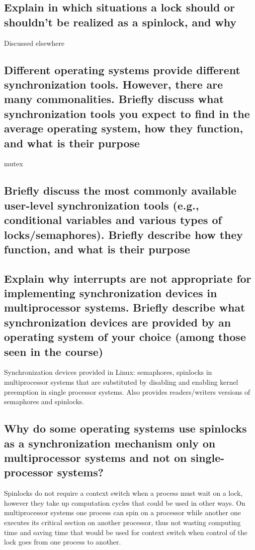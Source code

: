 \documentclass{article}
\begin{document}
\subsection{Explain in which situations a lock should or shouldn't be realized as a spinlock, and why}
Discussed elsewhere

\subsection{Different operating systems provide different synchronization tools. However, there are many commonalities. Briefly discuss what synchronization tools you expect to find in the average operating system, how they function, and what is their purpose}
mutex

\subsection{Briefly discuss the most commonly available user-level synchronization tools (e.g., conditional variables and various types of locks/semaphores). Briefly describe how they function, and what is their purpose}

\subsection{Explain why interrupts are not appropriate for implementing synchronization devices in multiprocessor systems. Briefly describe what synchronization devices are provided by an  operating system of your choice (among those seen in the course)}
Synchronization devices provided in Linux: semaphores, spinlocks in multiprocessor systems that are substituted by disabling and enabling kernel preemption in single processor systems. Also provides readers/writers versions of semaphores and spinlocks.

\subsection{Why do some operating systems use spinlocks as a synchronization mechanism only on multiprocessor systems and not on single-processor systems?}
Spinlocks do not require a context switch when a process must wait on a lock, however they take up computation cycles that could be used in other ways. On multiprocessor systems one process can spin on a processor while another one executes its critical section on another processor, thus not wasting computing time and saving time that would be used for context switch when control of the lock goes from one process to another.
\end{document}
